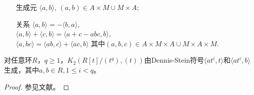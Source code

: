 \begin{itemize}
	\item[生成元]   $\langle a,b \rangle $, $(a,b)\in A\times M \cup M \times A$;
	\item[关系] $\langle a,b\rangle = -\langle b,a \rangle$, \\
	$\langle a,b\rangle +\langle c,b \rangle=\langle a+c-abc,b\rangle$, \\
	 $\langle a,bc\rangle =\langle ab,c\rangle +\langle ac,b\rangle$ 其中$(a,b,c)\in A\times M \times A \cup M\times A\times M$.
\end{itemize}

\begin{prop}
	对任意环$R$，$q\geq 1$，$K_2(R[t]/(t^q),(t))$由Dennis-Stein符号$\langle at^i,t\rangle$和$\langle at^i,b\rangle$生成，其中$a,b\in R, 1\leq i<q$。
\end{prop}
\begin{proof}
	参见文献\cite{MR82k:13016}。
\end{proof}


